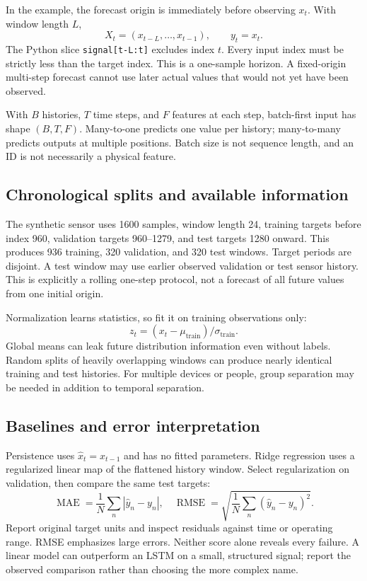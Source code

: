 \documentclass[11pt,oneside]{book}
\begin{document}
In the example, the forecast origin is immediately before observing $x_t$.
With window length $L$,
\[X_t=(x_{t-L},\ldots,x_{t-1}),\qquad y_t=x_t.\]
The Python slice \texttt{signal[t-L:t]} excludes index $t$. Every input
index must be strictly less than the target index. This is a one-sample
horizon. A fixed-origin multi-step forecast cannot use later actual values
that would not yet have been observed.

With $B$ histories, $T$ time steps, and $F$ features at each step, batch-first
input has shape $(B,T,F)$. Many-to-one predicts one value per history;
many-to-many predicts outputs at multiple positions. Batch size is not
sequence length, and an ID is not necessarily a physical feature.

\subsection{Chronological splits and available information}
The synthetic sensor uses 1600 samples, window length 24, training targets
before index 960, validation targets 960--1279, and test targets 1280 onward.
This produces 936 training, 320 validation, and 320 test windows.
Target periods are disjoint. A test window may use earlier observed
validation or test sensor history. This is explicitly a rolling one-step
protocol, not a forecast of all future values from one initial origin.

Normalization learns statistics, so fit it on training observations only:
\[z_t=(x_t-\mu_{\mathrm{train}})/\sigma_{\mathrm{train}}.\]
Global means can leak future distribution information even without labels.
Random splits of heavily overlapping windows can produce nearly identical
training and test histories. For multiple devices or people, group separation
may be needed in addition to temporal separation.

\subsection{Baselines and error interpretation}
Persistence uses $\hat x_t=x_{t-1}$ and has no fitted parameters. Ridge
regression uses a regularized linear map of the flattened history window.
Select regularization on validation, then compare the same test targets:
\[
\operatorname{MAE}=\frac1N\sum_n|\hat y_n-y_n|,\quad
\operatorname{RMSE}=\sqrt{\frac1N\sum_n(\hat y_n-y_n)^2}.
\]
Report original target units and inspect residuals against time or operating
range. RMSE emphasizes large errors. Neither score alone reveals every
failure. A linear model can outperform an LSTM on a small, structured signal;
report the observed comparison rather than choosing the more complex name.
\end{document}
